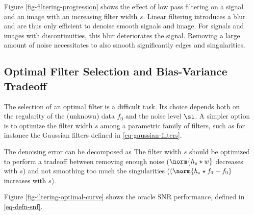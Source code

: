 \fi 

Figure \ref{fig-filtering-progression} shows the effect of low pass filtering on a signal and an image with an increasing filter width $s$.  Linear filtering introduces a blur and are thus only efficient to denoise smooth signals and image. For signals and images with discontinuities, this blur deteriorates the signal. Removing a large amount of noise necessitates to also smooth significantly edges and singularities.


\subsection{Optimal Filter Selection and Bias-Variance Tradeoff}
\label{subsec-optimal-selection-filter}

The selection of an optimal filter is a difficult task. Its choice depends both on the regularity of the (unknown) data $f_0$ and the noise level $\si$. A simpler option is to optimize the filter width $s$ among a parametric family of filters, such as for instance the Gaussian filters defined in \eqref{eq-gaussian-filters}.

The denoising error can be decomposed as
The filter width $s$ should be optimized to perform a tradeoff between removing enough noise ($\norm{h_s \star w}$ decreases with $s$) and not smoothing too much the singularities ($(\norm{h_s \star f_0 - f_0}$ increases with $s$).

Figure \eqref{fig-iltering-optimal-curve} shows the oracle SNR performance, defined in \eqref{eq-defn-snf}.


